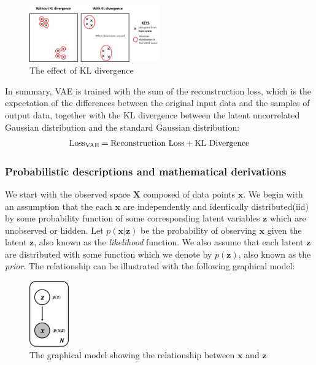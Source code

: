                 \begin{figure}[H] \label{fig:kl_effect}
                    \centering
                    \includegraphics[width=0.5\textwidth]{imgs/kl_effect.png}
                    \caption{The effect of KL divergence}
                \end{figure}
                
                In summary, VAE is trained with the sum of the reconstruction loss, which is the expectation of the differences between the original input data and the samples of output data, together with the KL divergence between the latent uncorrelated Gaussian distribution and the standard Gaussian distribution:
                \begin{equation} \label{eqn:loss_vae}
                    \text{Loss\textsubscript{VAE}} = \text{Reconstruction Loss} + \text{KL Divergence}
                \end{equation}
                
            \subsubsection{Probabilistic descriptions and mathematical derivations}
                We start with the observed space $\bm{X}$ composed of data points $\bm{x}$. We begin with an assumption that the each $\bm{x}$ are independently and identically distributed(iid) by some probability function of some corresponding latent variables $\bm{z}$ which are unobserved or hidden. Let $p(\bm{x}|\bm{z})$ be the probability of observing $\bm{x}$ given the latent $\bm{z}$, also known as the \textit{likelihood} function. We also assume that each latent $\bm{z}$ are distributed with some function which we denote by $p(\bm{z})$, also known as the \textit{prior}. The relationship can be illustrated with the following graphical model:
                
                \begin{figure}[H] \label{fig:x_z_graph}
                    \centering
                    \includegraphics[width=0.15\textwidth]{imgs/x_z_graph.png}
                    \caption{The graphical model showing the relationship between $\bm{x}$ and $\bm{z}$}
                \end{figure}
                

